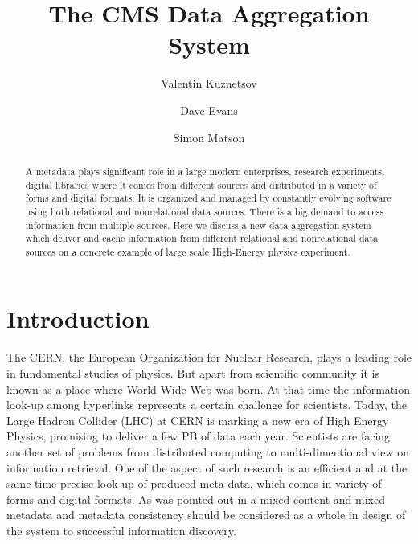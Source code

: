 \documentclass[a4paper]{jpconf}
\begin{document}
\title{The CMS Data Aggregation System}

\author{Valentin Kuznetsov}
\address{Cornell University, Ithaca, New York, USA}

\author{Dave Evans}
\address{Fermilab, Batavia, Illinois, USA}

\author{Simon Matson}
\address{Bristol University, Bristol, UK}



\begin{abstract}
A metadata plays significant role in a large modern enterprises, research experiments,
digital libraries where it comes from different sources and distributed in a 
variety of forms and digital formats. It is organized and managed by constantly
evolving software using both relational and nonrelational data sources. There is
a big demand to access information from multiple sources.
Here we discuss a new data aggregation system which deliver and cache information 
from different relational and nonrelational data sources on a concrete example 
of large scale High-Energy physics experiment.
\end{abstract}

\newpage

\section{Introduction}
The CERN, the European Organization for Nuclear Research, plays a leading
role in fundamental studies of physics. But apart from scientific community 
it is known as a place where World Wide Web was born. At that time the 
information look-up among hyperlinks represents a certain challenge for scientists.
Today, the Large Hadron Collider (LHC) at CERN is marking a new era of High Energy
Physics, promising to deliver a few PB of data each year. Scientists are
facing another set of problems from distributed computing to multi-dimentional
view on information retrieval. One of the aspect of such research is an efficient
and at the same time precise look-up of produced meta-data, which comes in variety 
of forms and digital formats. As was pointed out in \cite{Amr} a mixed content and 
mixed metadata and metadata consistency should be considered as a whole in design 
of the system to successful information discovery. 
\end{document}
